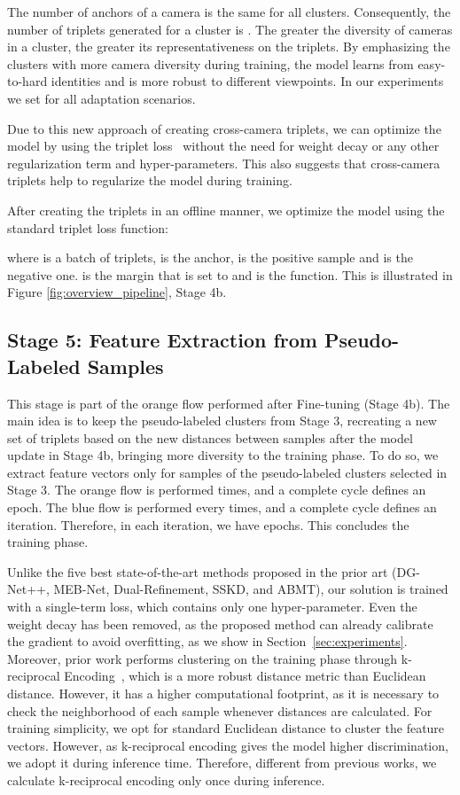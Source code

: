\documentclass[journal]{IEEEtran}
\begin{document}
The number  of anchors of a camera is the same for all clusters. Consequently, the number of triplets generated for a cluster  is . The greater the diversity of cameras in a cluster, the greater its representativeness on the triplets. By emphasizing the clusters with more camera diversity during training, the model learns from easy-to-hard identities and is more robust to different viewpoints. In our experiments we set  for all adaptation scenarios.

Due to this new approach of creating cross-camera triplets, we can optimize the model by using the triplet loss~\cite{schroff2015facenet} without the need for weight decay or any other regularization term and hyper-parameters. This also suggests that cross-camera triplets help to regularize the model during training.




After creating the triplets in an offline manner, we optimize the model using the standard triplet loss function:



\noindent where  is a batch of triplets,  is the anchor,  is the positive sample and  is the negative one.  is the margin that is set to  and  is the  function. This is illustrated in Figure \ref{fig:overview_pipeline}, Stage 4b.  

\subsection{Stage 5: Feature Extraction from Pseudo-Labeled Samples}

This stage is part of the orange flow performed after Fine-tuning (Stage 4b). The main idea is to keep the pseudo-labeled clusters from Stage 3, recreating a new set of triplets based on the new distances between samples after the model update in Stage 4b, bringing more diversity to the training phase. To do so, we extract feature vectors only for samples of the pseudo-labeled clusters selected in Stage 3. The orange flow is performed  times, and a complete cycle defines an epoch. The blue flow is performed every  times, and a complete cycle defines an iteration. Therefore, in each iteration, we have  epochs. This concludes the training phase. 

Unlike the five best state-of-the-art methods proposed in the prior art (DG-Net++, MEB-Net, Dual-Refinement, SSKD, and ABMT), our solution is trained with a single-term loss, which contains only one hyper-parameter. Even the weight decay has been removed, as the proposed method can already calibrate the gradient to avoid overfitting, as we show in Section~\ref{sec:experiments}. Moreover, prior work performs clustering on the training phase through k-reciprocal Encoding~\cite{zhong2017re}, which is a more robust distance metric than Euclidean distance. However, it has a higher computational footprint, as it is necessary to check the neighborhood of each sample whenever distances are calculated. For training simplicity, we opt for standard Euclidean distance to cluster the feature vectors. However, as k-reciprocal encoding gives the model higher discrimination, we adopt it during inference time. Therefore, different from previous works, we calculate k-reciprocal encoding only once during inference.
\end{document}

